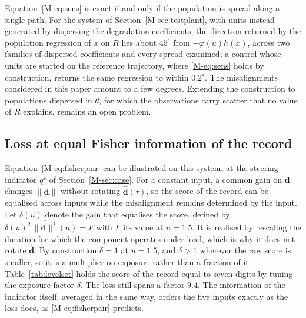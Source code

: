 \documentclass[12pt]{article}
\newcommand{\dvec}{\mathbf{d}}
\newcommand{\dhat}{\hat{\mathbf{d}}}
\begin{document}
Equation~\eqref{M-eq:sens} is exact if and only if the population is spread along a single path. For the system of Section~\ref{M-sec:testplant}, with units instead generated by dispersing the degradation coefficients, the direction returned by the population regression of $x$ on $R$ lies about $45^{\circ}$ from $-\varphi(u)h(x)$, across two families of dispersed coefficients and every spread examined; a control whose units are started on the reference trajectory, where \eqref{M-eq:sens} holds by construction, returns the same regression to within $0.2^{\circ}$. The misalignments considered in this paper amount to a few degrees. Extending the construction to populations dispersed in $\theta$, for which the observations carry scatter that no value of $R$ explains, remains an open problem.

\subsection{Loss at equal Fisher information of the record}

Equation~\eqref{M-eq:fisherpair} can be illustrated on this system, at the
steering indicator $q^{\star}$ of Section~\ref{M-sec:case}. For a
constant input, a common gain on $\dvec$ changes $\|\dvec\|$ without rotating
$\dhat(\tau)$, so the score of the record can be equalised across inputs
while the misalignment remains determined by the input. Let $\delta(u)$ denote
the gain that equalises the score, defined by
$\delta(u)^{2}\,\overline{\|\dvec\|^{2}}(u)=F$ with $F$ its value at
$u=1.5$. It is realised by rescaling the duration for which the component
operates under load, which is why it does not rotate $\dhat$. By
construction $\delta=1$ at $u=1.5$, and $\delta>1$ wherever the raw score is
smaller, so it is a multiplier on exposure rather than a fraction of it.
Table~\ref{tab:levelset} holds the score of the record equal to
seven digits by tuning the exposure factor $\delta$. The loss still spans a factor
$9.4$. The information of the indicator itself, averaged in the same way,
orders the five inputs exactly as the loss does, as \eqref{M-eq:fisherpair}
predicts.
\end{document}
